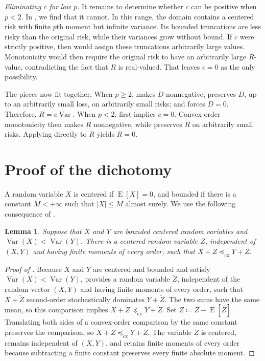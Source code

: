 \documentclass[11pt]{amsart}
\theoremstyle{plain}
\newtheorem{lemma}{Lemma}
\theoremstyle{definition}
\theoremstyle{remark}
\numberwithin{equation}{section}
\newcommand{\1}{\mathbf 1}
\begin{document}
\emph{Eliminating \(c\) for low \(p\).}
It remains to determine whether \(c\) can be positive when \(p<2\). In , we find that it cannot. In this range,
the domain contains a centered risk with finite \(p\)th moment but infinite variance. Its bounded truncations are less risky than the original risk, while their variances grow without bound. If \(c\) were strictly positive, then  would assign these truncations arbitrarily large values. Monotonicity would then require the original risk to have an arbitrarily large \(R\)-value, contradicting the fact that \(R\) is real-valued. That leaves \(c=0\) as the only possibility.

The pieces now fit together. When \(p\geq2\),  makes \(D\) nonnegative;  preserves \(D\), up to an arbitrarily small loss, on arbitrarily small risks; and  forces \(D=0\). Therefore, \(R=c\operatorname{Var}\). When \(p<2\),  first implies \(c=0\). Convex-order monotonicity then makes \(R\) nonnegative, while  preserves \(R\) on arbitrarily small risks. Applying  directly to \(R\) yields \(R=0\).

\section{Proof of the dichotomy}

A random variable \(X\) is centered if \(\operatorname{E}[X]=0\), and bounded if there is a constant \(M<+\infty\) such that \(|X|\leq M\) almost surely. We use the following consequence of \citet[Theorem~2]{pomattoStrackTamuz2020}.

\begin{lemma}\label{lem:background-risk-comparison}
Suppose that \(X\) and \(Y\) are bounded centered random variables and \(\operatorname{Var}(X)<\operatorname{Var}(Y)\). There is a centered random variable \(Z\), independent of \((X,Y)\) and having finite moments of every order, such that \(X+Z\preceq_{\mathrm{cx}}Y+Z\).
\end{lemma}

\begin{proof}[Proof of ]
Because \(X\) and \(Y\) are centered and bounded and satisfy
\(\operatorname{Var}(X)<\operatorname{Var}(Y)\), \citet[Theorem~2]{pomattoStrackTamuz2020} provides a random variable \(\widetilde Z\), independent of the random vector \((X,Y)\) and having finite moments of every order, such that \(X+\widetilde Z\) second-order stochastically dominates \(Y+\widetilde Z\). The two sums have the same mean, so this comparison implies \(X+\widetilde Z\preceq_{\mathrm{cx}}Y+\widetilde Z\). Set \(Z\coloneqq\widetilde Z-\operatorname{E}[\widetilde Z]\). Translating both sides of a convex-order comparison by the same constant preserves the comparison, so \(X+Z\preceq_{\mathrm{cx}}Y+Z\). The variable \(Z\) is centered, remains independent of \((X,Y)\), and retains finite moments of every order because subtracting a finite constant preserves every finite absolute moment.
\end{proof}
\end{document}
